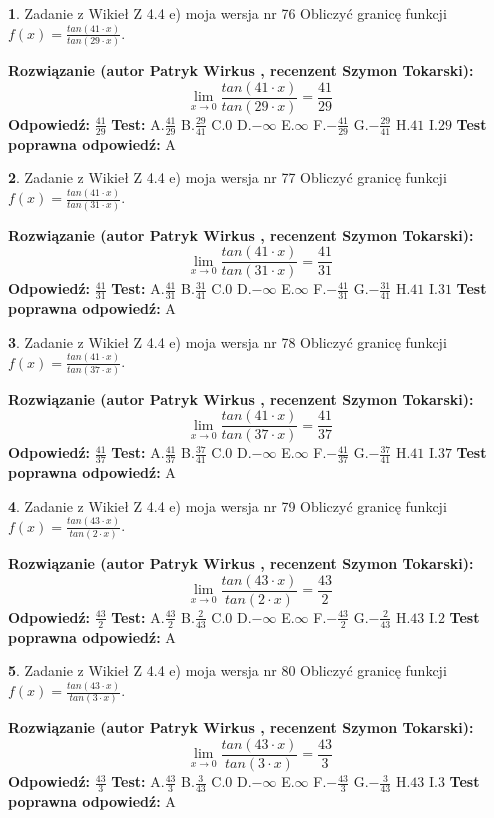 \documentclass[12pt, a4paper]{article}
\theoremstyle{definition} %
\newtheorem{zad}{}
\newcommand{\zadStart}[1]{\begin{zad}#1\newline}
\newcommand{\zadStop}{\end{zad}}
\newcommand{\rozwStart}[2]{\noindent \textbf{Rozwiązanie (autor #1 , recenzent #2): }\newline}
\newcommand{\rozwStop}{\newline}
\newcommand{\odpStart}{\noindent \textbf{Odpowiedź:}\newline}
\newcommand{\odpStop}{\newline}
\newcommand{\testStart}{\noindent \textbf{Test:}\newline}
\newcommand{\testStop}{\newline}
\newcommand{\kluczStart}{\noindent \textbf{Test poprawna odpowiedź:}\newline}
\newcommand{\kluczStop}{\newline}
\begin{document}
\zadStart{Zadanie z Wikieł Z 4.4 e) moja wersja nr 76}
Obliczyć granicę funkcji $f(x)=\frac{tan(41\cdot x)}{tan(29\cdot x)}$.
\zadStop
\rozwStart{Patryk Wirkus}{Szymon Tokarski}
$$\lim\limits_{x\to 0}\frac{tan(41\cdot x)}{tan(29\cdot x)}=
\frac{41}{29}$$
\rozwStop
\odpStart
$\frac{41}{29}$
\odpStop
\testStart
A.$\frac{41}{29}$
B.$\frac{29}{41}$
C.$0$
D.$-\infty$
E.$\infty$
F.$-\frac{41}{29}$
G.$-\frac{29}{41}$
H.$41$
I.$29$
\testStop
\kluczStart
A
\kluczStop



\zadStart{Zadanie z Wikieł Z 4.4 e) moja wersja nr 77}
Obliczyć granicę funkcji $f(x)=\frac{tan(41\cdot x)}{tan(31\cdot x)}$.
\zadStop
\rozwStart{Patryk Wirkus}{Szymon Tokarski}
$$\lim\limits_{x\to 0}\frac{tan(41\cdot x)}{tan(31\cdot x)}=
\frac{41}{31}$$
\rozwStop
\odpStart
$\frac{41}{31}$
\odpStop
\testStart
A.$\frac{41}{31}$
B.$\frac{31}{41}$
C.$0$
D.$-\infty$
E.$\infty$
F.$-\frac{41}{31}$
G.$-\frac{31}{41}$
H.$41$
I.$31$
\testStop
\kluczStart
A
\kluczStop



\zadStart{Zadanie z Wikieł Z 4.4 e) moja wersja nr 78}
Obliczyć granicę funkcji $f(x)=\frac{tan(41\cdot x)}{tan(37\cdot x)}$.
\zadStop
\rozwStart{Patryk Wirkus}{Szymon Tokarski}
$$\lim\limits_{x\to 0}\frac{tan(41\cdot x)}{tan(37\cdot x)}=
\frac{41}{37}$$
\rozwStop
\odpStart
$\frac{41}{37}$
\odpStop
\testStart
A.$\frac{41}{37}$
B.$\frac{37}{41}$
C.$0$
D.$-\infty$
E.$\infty$
F.$-\frac{41}{37}$
G.$-\frac{37}{41}$
H.$41$
I.$37$
\testStop
\kluczStart
A
\kluczStop



\zadStart{Zadanie z Wikieł Z 4.4 e) moja wersja nr 79}
Obliczyć granicę funkcji $f(x)=\frac{tan(43\cdot x)}{tan(2\cdot x)}$.
\zadStop
\rozwStart{Patryk Wirkus}{Szymon Tokarski}
$$\lim\limits_{x\to 0}\frac{tan(43\cdot x)}{tan(2\cdot x)}=
\frac{43}{2}$$
\rozwStop
\odpStart
$\frac{43}{2}$
\odpStop
\testStart
A.$\frac{43}{2}$
B.$\frac{2}{43}$
C.$0$
D.$-\infty$
E.$\infty$
F.$-\frac{43}{2}$
G.$-\frac{2}{43}$
H.$43$
I.$2$
\testStop
\kluczStart
A
\kluczStop



\zadStart{Zadanie z Wikieł Z 4.4 e) moja wersja nr 80}
Obliczyć granicę funkcji $f(x)=\frac{tan(43\cdot x)}{tan(3\cdot x)}$.
\zadStop
\rozwStart{Patryk Wirkus}{Szymon Tokarski}
$$\lim\limits_{x\to 0}\frac{tan(43\cdot x)}{tan(3\cdot x)}=
\frac{43}{3}$$
\rozwStop
\odpStart
$\frac{43}{3}$
\odpStop
\testStart
A.$\frac{43}{3}$
B.$\frac{3}{43}$
C.$0$
D.$-\infty$
E.$\infty$
F.$-\frac{43}{3}$
G.$-\frac{3}{43}$
H.$43$
I.$3$
\testStop
\kluczStart
A
\kluczStop
\end{document}
